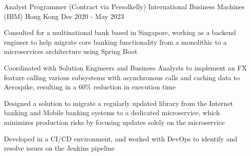 \begin{cventries}
  \cventry
    {Analyst Programmer (Contract via Persolkelly)}
    {International Business Machines (IBM)}
    {Hong Kong}
    {Dec 2020 - May 2023}
    {
        \begin{cvitems}
          \item {Consulted for a multinational bank based in Singapore, working as a backend engineer to help migrate core banking functionality from a monolithic to a microservices architecture using Spring Boot}
          \item {Coordinated with Solution Engineers and Business Analysts to implement an FX feature calling various subsystems with asynchronous calls and caching data to Aerospike, resulting in a 60\% reduction in execution time}
          \item {Designed a solution to migrate a regularly updated library from the Internet banking and Mobile banking systems to a dedicated microservice, which minimizes production risks by focusing updates solely on the microservice}
          \item {Developed in a CI/CD environment, and worked with DevOps to identify and resolve issues on the Jenkins pipeline}
        \end{cvitems}
    }
  

\end{cventries}
